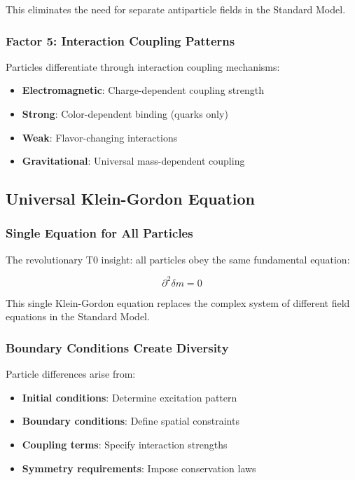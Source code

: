 	This eliminates the need for separate antiparticle fields in the Standard Model.
	
	\subsubsection{Factor 5: Interaction Coupling Patterns}
	\label{subsubsec:coupling_patterns}
	
	Particles differentiate through interaction coupling mechanisms:
	\begin{itemize}
		\item \textbf{Electromagnetic}: Charge-dependent coupling strength
		\item \textbf{Strong}: Color-dependent binding (quarks only)
		\item \textbf{Weak}: Flavor-changing interactions
		\item \textbf{Gravitational}: Universal mass-dependent coupling
	\end{itemize}
	
	\subsection{Universal Klein-Gordon Equation}
	\label{subsec:universal_klein_gordon}
	
	\subsubsection{Single Equation for All Particles}
	\label{subsubsec:single_equation}
	
	The revolutionary T0 insight: all particles obey the same fundamental equation:
	
	\begin{equation}
		\boxed{\partial^2 \delta m = 0}
		\label{eq:universal_equation}
	\end{equation}
	
	This single Klein-Gordon equation replaces the complex system of different field equations in the Standard Model.
	
	\subsubsection{Boundary Conditions Create Diversity}
	\label{subsubsec:boundary_conditions}
	
	Particle differences arise from:
	\begin{itemize}
		\item \textbf{Initial conditions}: Determine excitation pattern
		\item \textbf{Boundary conditions}: Define spatial constraints  
		\item \textbf{Coupling terms}: Specify interaction strengths
		\item \textbf{Symmetry requirements}: Impose conservation laws
	\end{itemize}
	
